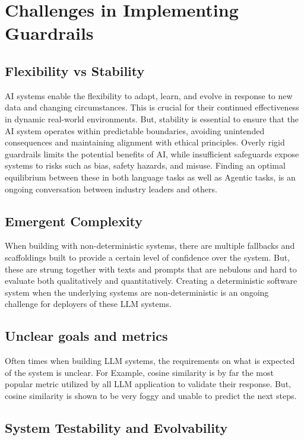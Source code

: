 \documentclass[11pt]{article}
\begin{document}
\section{ Challenges in Implementing Guardrails }

\subsection{ Flexibility vs Stability }

AI systems enable the flexibility to adapt, learn, and evolve in response to new data and changing circumstances. This is crucial for their continued effectiveness in dynamic real-world environments. But, stability is essential to ensure that the AI system operates within predictable boundaries, avoiding unintended consequences and maintaining alignment with ethical principles. Overly rigid guardrails limits the potential benefits of AI, while insufficient safeguards expose systems to risks such as bias, safety hazards, and misuse. Finding an optimal equilibrium between these in both language tasks as well as Agentic tasks, is an ongoing conversation between industry leaders and others.

\subsection{ Emergent Complexity }

When building with non-deterministic systems, there are multiple fallbacks and scaffoldings built to provide a certain level of confidence over the system. But, these are strung together with texts and prompts that are nebulous and hard to evaluate both qualitatively and quantitatively.
Creating a deterministic software system when the underlying systems are non-deterministic is an ongoing challenge for deployers of these LLM systems.

\subsection{ Unclear goals and metrics }

Often times when building LLM systems, the requirements on what is expected of the system is unclear. For Example, cosine similarity is by far the most popular metric utilized by all LLM application to validate their response. But, cosine similarity is shown to be very foggy and unable to predict the next steps.

\subsection{ System Testability and Evolvability }
\end{document}
